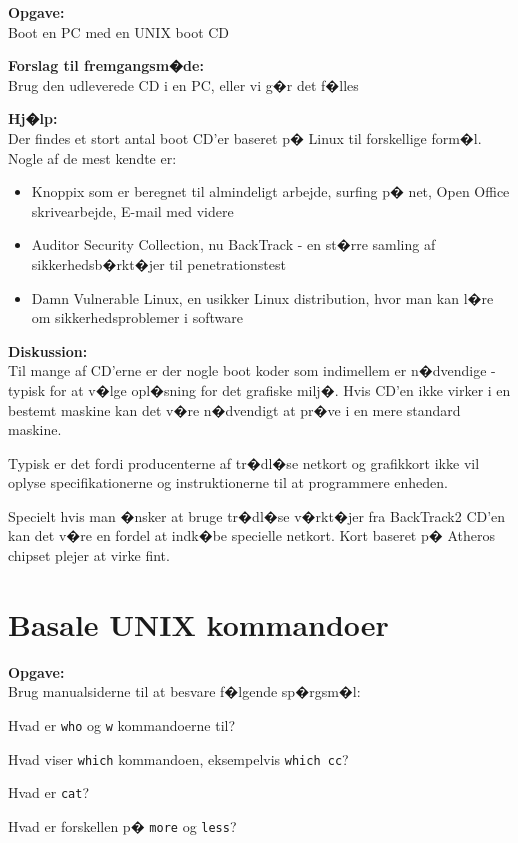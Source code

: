 \documentclass[a4paper,11pt,notitlepage]{oevelser}
\begin{document}
{\bfseries Opgave:}\\
Boot en PC med en UNIX boot CD

{\bfseries Forslag til fremgangsm�de:}\\
Brug den udleverede CD i en PC, eller vi g�r det f�lles

{\bfseries Hj�lp:}\\
Der findes et stort antal boot CD'er baseret p� Linux til forskellige
form�l. Nogle af de mest kendte er:
\begin{itemize}
\item Knoppix som er beregnet til almindeligt arbejde, surfing p� net,
  Open Office skrivearbejde, E-mail med videre
\item Auditor Security Collection, nu BackTrack - en st�rre
  samling af sikkerhedsb�rkt�jer til penetrationstest
\item Damn Vulnerable Linux, en usikker Linux distribution, hvor man
  kan l�re om sikkerhedsproblemer i software
\end{itemize}

{\bf Diskussion:}\\
Til mange af CD'erne er der nogle boot koder som indimellem er
n�dvendige - typisk for at v�lge opl�sning for det grafiske
milj�. Hvis CD'en ikke virker i en bestemt maskine kan det v�re
n�dvendigt at pr�ve i en mere standard maskine.

Typisk er det fordi producenterne af tr�dl�se netkort og grafikkort
ikke vil oplyse specifikationerne og instruktionerne til at
programmere enheden.

Specielt hvis man �nsker at bruge tr�dl�se v�rkt�jer fra BackTrack2
CD'en kan det v�re en fordel at indk�be specielle netkort. Kort
baseret p� Atheros chipset plejer at virke fint.

\chapter{Basale UNIX kommandoer}
\label{ex:unix-basic-commands}

{\bfseries Opgave:}\\
Brug manualsiderne til at besvare f�lgende sp�rgsm�l:

\begin{list2}
\item Hvad er \verb+who+ og \verb+w+ kommandoerne til?
\item Hvad viser \verb+which+ kommandoen, eksempelvis \verb+which cc+?
\item Hvad er \verb+cat+?
\item Hvad er forskellen p� \verb+more+ og \verb+less+?
\end{list2}
\end{document}
